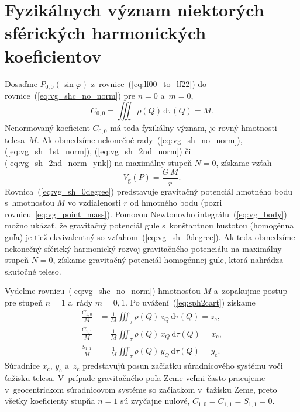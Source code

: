 \documentclass[a4paper,12pt]{book}
\newcommand{\diff}{\mathrm d}
\newcommand{\gidx}{\mathrm g}
\begin{document}

\section{Fyzikálnych význam niektorých sférických harmonických koeficientov}
\label{sec:physical_meaning_of_spherical_harmonic_coefficients}

Dosaďme $P_{0,0}(\sin\varphi)$ z~rovnice~(\ref{eq:lf00_to_lf22})
do rovnice~(\ref{eq:vg_shc_no_norm}) pre $n = 0$ a~$m = 0$,
%
\begin{equation}
C_{0,0} = \iiint_{\tau} \rho(Q) \, \diff \tau(Q) = M{.}
\end{equation}
%
Nenormovaný koeficient $C_{0,0}$ má teda fyzikálny význam, je rovný hmotnosti 
telesa~$M$.  Ak obmedzíme nekonečné rady~(\ref{eq:vg_sh_no_norm}), 
(\ref{eq:vg_sh_1st_norm}), (\ref{eq:vg_sh_2nd_norm}) či 
(\ref{eq:vg_sh_2nd_norm_ynk}) na maximálny stupeň $N = 0$, získame vzťah
%
\begin{equation}
\label{eq:vg_sh_0degree}
V_\gidx(P) = \frac{G \, M}{r}{.}
\end{equation}
%
Rovnica~(\ref{eq:vg_sh_0degree}) predstavuje gravitačný potenciál hmotného bodu
s~hmotnosťou $M$ vo vzdialenosti $r$ od hmotného bodu (pozri
rovnicu~\ref{eq:vg_point_mass}).  Pomocou Newtonovho
integrálu~(\ref{eq:vg_body}) možno ukázať, že gravitačný potenciál gule
s~konštantnou hustotou (homogénna guľa) je tiež ekvivalentný so
vzťahom~(\ref{eq:vg_sh_0degree}).  Ak teda obmedzíme nekonečný sférický
harmonický rozvoj gravitačného potenciálu na maximálny stupeň $N = 0$, získame
gravitačný potenciál homogénnej gule, ktorá nahrádza skutočné teleso.

Vydeľme rovnicu~(\ref{eq:vg_shc_no_norm}) hmotnosťou $M$ a~zopakujme postup pre
stupeň $n = 1$ a~rády $m = 0, 1$.  Po uvážení~(\ref{eq:sph2cart}) získame
%
\begin{equation}
\begin{split}
\frac{C_{1,0}}{M} &= \frac{1}{M} \iiint_{\tau} \rho(Q) \, z_Q \, \diff \tau(Q)
= z_\mathrm{c}{,}\\
\frac{C_{1,1}}{M} &= \frac{1}{M} \iiint_{\tau} \rho(Q) \, x_Q \, \diff \tau(Q)
= x_\mathrm{c}{,}\\
\frac{S_{1,1}}{M} &= \frac{1}{M} \iiint_{\tau} \rho(Q) \, y_Q \, \diff \tau(Q)
= y_\mathrm{c}{.}
\end{split}
\end{equation}
%
Súradnice $x_\mathrm{c}$, $y_\mathrm{c}$ a~$z_\mathrm{c}$ predstavujú posun
začiatku súradnicového systému voči ťažisku telesa.  V~prípade gravitačného
poľa Zeme veľmi často pracujeme v~geocentrickom súradnicovom systéme so
začiatkom v~ťažisku Zeme, preto všetky koeficienty stupňa $n = 1$ sú zvyčajne
nulové, $C_{1,0} = C_{1,1} = S_{1,1} = 0$.
\end{document}
